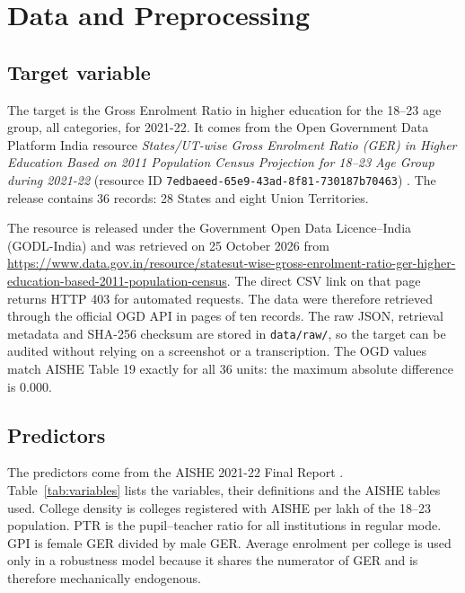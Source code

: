 \section{Data and Preprocessing}\label{sec:data}

\subsection{Target variable}

The target is the Gross Enrolment Ratio in higher education for the 18--23 age group, all categories, for 2021-22. It comes from the Open Government Data Platform India resource \emph{States/UT-wise Gross Enrolment Ratio (GER) in Higher Education Based on 2011 Population Census Projection for 18--23 Age Group during 2021-22} (resource ID \texttt{7edbaeed-65e9-43ad-8f81-730187b70463}) \cite{ogd2025}. The release contains 36 records: 28 States and eight Union Territories.

The resource is released under the Government Open Data Licence--India (GODL-India) and was retrieved on 25 October 2026 from \url{https://www.data.gov.in/resource/statesut-wise-gross-enrolment-ratio-ger-higher-education-based-2011-population-census}. The direct CSV link on that page returns HTTP 403 for automated requests. The data were therefore retrieved through the official OGD API in pages of ten records. The raw JSON, retrieval metadata and SHA-256 checksum are stored in \texttt{data/raw/}, so the target can be audited without relying on a screenshot or a transcription. The OGD values match AISHE Table 19 exactly for all 36 units: the maximum absolute difference is 0.000.

\subsection{Predictors}

The predictors come from the AISHE 2021-22 Final Report \cite{aishe2023}. Table~\ref{tab:variables} lists the variables, their definitions and the AISHE tables used. College density is colleges registered with AISHE per lakh of the 18--23 population. PTR is the pupil--teacher ratio for all institutions in regular mode. GPI is female GER divided by male GER. Average enrolment per college is used only in a robustness model because it shares the numerator of GER and is therefore mechanically endogenous.

